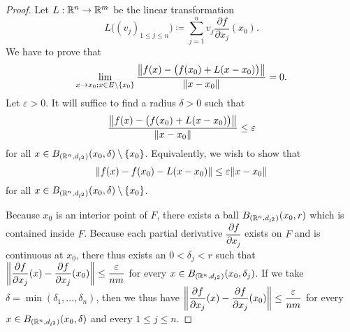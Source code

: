 \begin{proof}
  Let \(L : \R^n \to \R^m\) be the linear transformation
  \[
    L\big((v_j)_{1 \leq j \leq n}\big) \coloneqq \sum_{j = 1}^n v_j \dfrac{\partial f}{\partial x_j}(x_0).
  \]
  We have to prove that
  \[
    \lim_{x \to x_0 ; x \in E \setminus \{x_0\}} \dfrac{\norm*{f(x) - \big(f(x_0) + L(x - x_0)\big)}}{\norm*{x - x_0}} = 0.
  \]
  Let \(\varepsilon > 0\).
  It will suffice to find a radius \(\delta > 0\) such that
  \[
    \dfrac{\norm*{f(x) - \big(f(x_0) + L(x - x_0)\big)}}{\norm*{x - x_0}} \leq \varepsilon
  \]
  for all \(x \in B_{(\R^n, d_{l^2})}(x_0, \delta) \setminus \{x_0\}\).
  Equivalently, we wish to show that
  \[
    \norm*{f(x) - f(x_0) - L(x - x_0)} \leq \varepsilon \norm*{x - x_0}
  \]
  for all \(x \in B_{(\R^n, d_{l^2})}(x_0, \delta) \setminus \{x_0\}\).

  Because \(x_0\) is an interior point of \(F\), there exists a ball \(B_{(\R^n, d_{l^2})}(x_0, r)\) which is contained inside \(F\).
  Because each partial derivative \(\dfrac{\partial f}{\partial x_j}\) exists on \(F\) and is continuous at \(x_0\), there thus exists an \(0 < \delta_j < r\) such that \(\norm*{\dfrac{\partial f}{\partial x_j}(x) - \dfrac{\partial f}{\partial x_j}(x_0)} \leq \dfrac{\varepsilon}{nm}\) for every \(x \in B_{(\R^n, d_{l^2})}(x_0, \delta_j)\).
  If we take \(\delta = \min(\delta_1, \dots, \delta_n)\), then we thus have \(\norm*{\dfrac{\partial f}{\partial x_j}(x) - \dfrac{\partial f}{\partial x_j}(x_0)} \leq \dfrac{\varepsilon}{nm}\) for every \(x \in B_{(\R^n, d_{l^2})}(x_0, \delta)\) and every \(1 \leq j \leq n\).


\end{proof}
